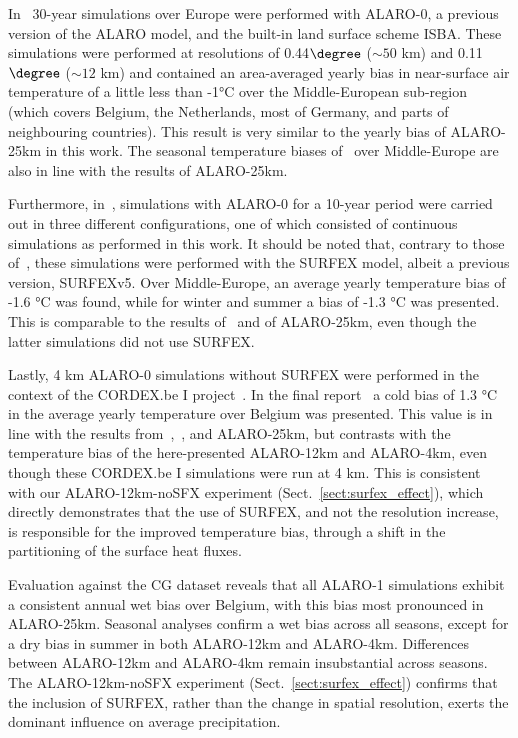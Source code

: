 \documentclass[journal abbreviation, manuscript]{copernicus}
\begin{document}
In~\citet{giot_validation_2016} 30-year simulations over Europe were performed with ALARO-0, a previous version of the ALARO model, and the built-in land surface scheme ISBA.
These simulations were performed at resolutions of 0.44$\degree$ ($\sim 50$ km) and 0.11$\degree$  ($\sim 12$ km) and contained an area-averaged yearly bias in near-surface air temperature of a little less than -1°C over the Middle-European sub-region (which covers Belgium, the Netherlands, most of Germany, and parts of neighbouring countries).
This result is very similar to the yearly bias of ALARO-25km in this work.
The seasonal temperature biases of~\citet{giot_validation_2016} over Middle-Europe are also in line with the results of ALARO-25km. 

Furthermore, in~\citet{berckmans_reinitialised_2017}, simulations with ALARO-0 for a 10-year period were carried out in three different configurations, one of which consisted of continuous simulations as performed in this work. 
It should be noted that, contrary to those of~\citet{giot_validation_2016}, these simulations were performed with the SURFEX model, albeit a previous version, SURFEXv5. 
Over Middle-Europe, an average yearly temperature bias of -1.6 °C was found, while for winter and summer a bias of -1.3 °C was presented.
This is comparable to the results of~\citet{giot_validation_2016} and of ALARO-25km, even though the latter simulations did not use SURFEX.

Lastly, 4 km ALARO-0 simulations without SURFEX were performed in the context of the CORDEX.be I project~\citep{termonia_cordexbe_2018}. 
In the final report~\citep{termonia_combining_2018} a cold bias of 1.3 °C in the average yearly temperature over Belgium was presented. 
This value is in line with the results from~\citet{giot_validation_2016},~\citet{berckmans_reinitialised_2017}, and ALARO-25km, 
but contrasts with the temperature bias of the here-presented ALARO-12km and ALARO-4km, even though these CORDEX.be I simulations were run at 4 km. 
This is consistent with our ALARO-12km-noSFX experiment (Sect.~\ref{sect:surfex_effect}), which directly demonstrates that the use of SURFEX, and not the resolution increase, is responsible for the improved temperature bias, through a shift in the partitioning of the surface heat fluxes.

Evaluation against the CG dataset reveals that all ALARO-1 simulations exhibit a consistent annual wet bias over Belgium, with this bias most pronounced in ALARO-25km. 
Seasonal analyses confirm a wet bias across all seasons, except for a dry bias in summer in both ALARO-12km and ALARO-4km. 
Differences between ALARO-12km and ALARO-4km remain insubstantial across seasons.
The ALARO-12km-noSFX experiment (Sect.~\ref{sect:surfex_effect}) confirms that the inclusion of SURFEX, rather than the change in spatial resolution, exerts the dominant influence on average precipitation.
\end{document}
